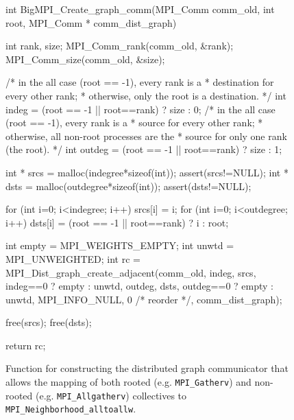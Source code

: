 \begin{figure}
\begin{code}
int BigMPI_Create_graph_comm(MPI_Comm comm_old, int root, 
                             MPI_Comm * comm_dist_graph)
{
    int rank, size;
    MPI_Comm_rank(comm_old, &rank);
    MPI_Comm_size(comm_old, &size);

    /* in the all case (root == -1), every rank is a 
     * destination for every other rank;
     * otherwise, only the root is a destination. */
    int indeg  = (root == -1 || root==rank) ? size : 0;
    /* in the all case (root == -1), every rank is a 
     * source for every other rank;
     * otherwise, all non-root processes are the 
     * source for only one rank (the root). */
    int outdeg = (root == -1 || root==rank) ? size : 1;

    int * srcs = malloc(indegree*sizeof(int));  
    assert(srcs!=NULL);
    int * dsts = malloc(outdegree*sizeof(int)); 
    assert(dsts!=NULL);

    for (int i=0; i<indegree; i++) {
        srcs[i] = i;
    }
    for (int i=0; i<outdegree; i++) {
        dsts[i] = (root == -1 || root==rank) ? i : root;
    }

    int empty = MPI_WEIGHTS_EMPTY;
    int unwtd = MPI_UNWEIGHTED;
    int rc = MPI_Dist_graph_create_adjacent(comm_old,
                indeg, srcs, indeg==0 ? empty : unwtd,
                outdeg, dsts, outdeg==0 ? empty : unwtd,
                MPI_INFO_NULL, 0 /* reorder */, 
                comm_dist_graph);

    free(srcs);
    free(dsts);

    return rc;
}
\end{code}
\label{code:BigMPI_Create_graph_comm}
\caption{Function for constructing the distributed graph communicator
that allows the mapping of both rooted (e.g. \texttt{MPI\_Gatherv}) and
non-rooted (e.g. \texttt{MPI\_Allgatherv}) collectives to
\texttt{MPI\_Neighborhood\_alltoallw}.}
\end{figure}
